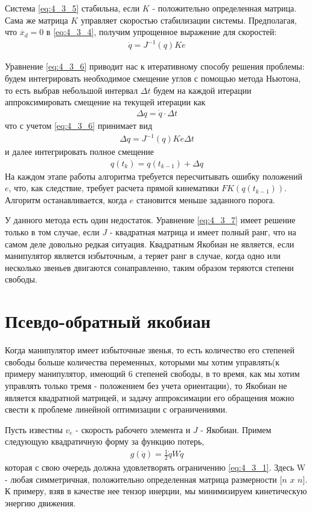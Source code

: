 Система \ref{eq:4_3_5} стабильна, если $K$ - положительно определенная матрица. Сама же матрица $K$ управляет скоростью стабилизации системы. Предполагая, что $\dot{x_{d}} = 0$ в \ref{eq:4_3_4}, получим упрощенное выражение для скоростей:
\begin{align} \label{eq:4_3_6}
	\dot{q} = J^{-1}(q)Ke
\end{align}

Уравнение \ref{eq:4_3_6} приводит нас к итеративному способу решения проблемы: будем интегрировать необходимое смещение углов с помощью метода Ньютона, то есть выбрав небольшой интервал $\Delta t$ будем на каждой итерации аппроксимировать смещение на текущей итерации как 
\begin{align*}
	\Delta q = \dot{q} \cdot \Delta t 
\end{align*}
что с учетом \ref{eq:4_3_6} принимает вид
\begin{align} \label{eq:4_3_7}
	\Delta q = J^{-1}(q)Ke\Delta t
\end{align}
и далее интегрировать полное смещение
\begin{align*}
	q(t_{k}) = q(t_{k-1}) + \Delta q
\end{align*}
На каждом этапе работы алгоритма требуется пересчитывать ошибку положений $e$, что, как следствие, требует расчета прямой кинематики $FK(q(t_{k-1}))$. Алгоритм останавливается, когда $e$ становится меньше заданного порога. 

У данного метода есть один недостаток. Уравнение \ref{eq:4_3_7} имеет решение только в том случае, если $J$ - квадратная матрица и имеет полный ранг, что на самом деле довольно редкая ситуация. Квадратным Якобиан не является, если манипулятор является избыточным, а теряет ранг в случае, когда одно или несколько звеньев двигаются сонаправленно, таким образом теряются степени свободы.


\section{Псевдо-обратный якобиан} \label{sec:4_4}
Когда манипулятор имеет избыточные звенья, то есть количество его степеней свободы больше количества переменных, которыми мы хотим управлять(к примеру манипулятор, имеющий 6 степеней свободы, в то время, как мы хотим управлять только тремя - положением без учета ориентации), то Якобиан не является квадратной матрицей, и задачу аппроксимации его обращения можно свести к проблеме линейной оптимизации с ограничениями. \cite{Bruno}

Пусть известны $v_{e}$ - скорость рабочего элемента и $J$ - Якобиан. Примем следующую квадратичную форму за функцию потерь, 
\begin{align}
	g(\dot q) = \frac{1}{2} \dot q W \dot{q}
\end{align}
которая с свою очередь должна удовлетворять ограничению \ref{eq:4_3_1}. Здесь W - любая симметричная, положительно определенная матрица размерности $[n$ $x$ $n]$. К примеру, взяв в качестве нее тензор инерции, мы минимизируем кинетическую энергию движения.

